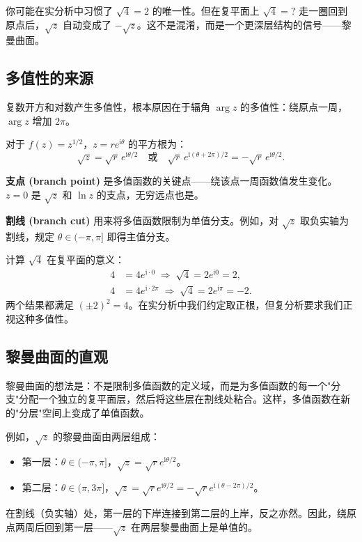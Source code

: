 你可能在实分析中习惯了 $\sqrt{4}=2$ 的唯一性。但在复平面上 $\sqrt{4}=?$ 走一圈回到原点后，$\sqrt{z}$ 自动变成了 $-\sqrt{z}$。这不是混淆，而是一个更深层结构的信号——黎曼曲面。

\subsection{多值性的来源}

复数开方和对数产生多值性，根本原因在于辐角 $\arg z$ 的多值性：绕原点一周，$\arg z$ 增加 $2\pi$。

对于 $f(z) = z^{1/2}$，$z = re^{\mathrm{i}\theta}$ 的平方根为：
\begin{equation}
\sqrt{z} = \sqrt{r}\,e^{\mathrm{i}\theta/2}
\quad\text{或}\quad \sqrt{r}\,e^{\mathrm{i}(\theta+2\pi)/2} = -\sqrt{r}\,e^{\mathrm{i}\theta/2}.
\end{equation}

\textbf{支点 (branch point)} 是多值函数的关键点——绕该点一周函数值发生变化。$z=0$ 是 $\sqrt{z}$ 和 $\ln z$ 的支点，无穷远点也是。

\textbf{割线 (branch cut)} 用来将多值函数限制为单值分支。例如，对 $\sqrt{z}$ 取负实轴为割线，规定 $\theta \in (-\pi,\pi]$ 即得主值分支。

\begin{example}[多值性的数值体验]
计算 $\sqrt{4}$ 在复平面的意义：
\begin{align*}
4 &= 4e^{\mathrm{i}\cdot 0} \;\Rightarrow\; \sqrt{4} = 2e^{\mathrm{i}0} = 2,\\
4 &= 4e^{\mathrm{i}\cdot 2\pi} \;\Rightarrow\; \sqrt{4} = 2e^{\mathrm{i}\pi} = -2.
\end{align*}
两个结果都满足 $(\pm2)^2 = 4$。在实分析中我们约定取正根，但复分析要求我们正视这种多值性。
\end{example}

\subsection{黎曼曲面的直观}

黎曼曲面的想法是：不是限制多值函数的定义域，而是为多值函数的每一个"分支"分配一个独立的复平面层，然后将这些层在割线处粘合。这样，多值函数在新的"分层"空间上变成了单值函数。

例如，$\sqrt{z}$ 的黎曼曲面由两层组成：
\begin{itemize}
\item 第一层：$\theta \in (-\pi,\pi]$，$\sqrt{z} = \sqrt{r}e^{\mathrm{i}\theta/2}$。
\item 第二层：$\theta \in (\pi,3\pi]$，$\sqrt{z} = \sqrt{r}e^{\mathrm{i}\theta/2} = -\sqrt{r}e^{\mathrm{i}(\theta-2\pi)/2}$。
\end{itemize}
在割线（负实轴）处，第一层的下岸连接到第二层的上岸，反之亦然。因此，绕原点两周后回到第一层——$\sqrt{z}$ 在两层黎曼曲面上是单值的。

